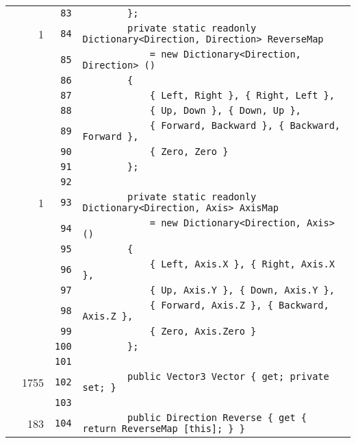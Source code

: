 \documentclass[a4paper,10pt]{article}
\begin{document}
\begin{longtable}[l]{lrrl}
\cellcolor{gray} &  & \verb~83~ & \verb~        };~\\
\cellcolor{green} & 1 & \verb~84~ & \verb~        private static readonly Dictionary<Direction, Direction> ReverseMap~\\
\cellcolor{gray} &  & \verb~85~ & \verb~            = new Dictionary<Direction, Direction> ()~\\
\cellcolor{gray} &  & \verb~86~ & \verb~        {~\\
\cellcolor{gray} &  & \verb~87~ & \verb~            { Left, Right }, { Right, Left },~\\
\cellcolor{gray} &  & \verb~88~ & \verb~            { Up, Down }, { Down, Up },~\\
\cellcolor{gray} &  & \verb~89~ & \verb~            { Forward, Backward }, { Backward, Forward },~\\
\cellcolor{gray} &  & \verb~90~ & \verb~            { Zero, Zero }~\\
\cellcolor{gray} &  & \verb~91~ & \verb~        };~\\
\cellcolor{gray} &  & \verb~92~ & \verb~~\\
\cellcolor{green} & 1 & \verb~93~ & \verb~        private static readonly Dictionary<Direction, Axis> AxisMap~\\
\cellcolor{gray} &  & \verb~94~ & \verb~            = new Dictionary<Direction, Axis> ()~\\
\cellcolor{gray} &  & \verb~95~ & \verb~        {~\\
\cellcolor{gray} &  & \verb~96~ & \verb~            { Left, Axis.X }, { Right, Axis.X },~\\
\cellcolor{gray} &  & \verb~97~ & \verb~            { Up, Axis.Y }, { Down, Axis.Y },~\\
\cellcolor{gray} &  & \verb~98~ & \verb~            { Forward, Axis.Z }, { Backward, Axis.Z },~\\
\cellcolor{gray} &  & \verb~99~ & \verb~            { Zero, Axis.Zero }~\\
\cellcolor{gray} &  & \verb~100~ & \verb~        };~\\
\cellcolor{gray} &  & \verb~101~ & \verb~~\\
\cellcolor{green} & 1755 & \verb~102~ & \verb~        public Vector3 Vector { get; private set; }~\\
\cellcolor{gray} &  & \verb~103~ & \verb~~\\
\cellcolor{green} & 183 & \verb~104~ & \verb~        public Direction Reverse { get { return ReverseMap [this]; } }~\\

\end{longtable}
\end{document}
